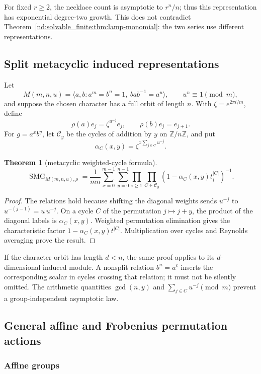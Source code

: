 \documentclass[10pt]{article}
\newcommand{\SMG}{\operatorname{SMG}}
\newcommand{\MGF}{\SMG}
\newtheorem{theorem}{Theorem}
\begin{document}
For fixed $r\geq2$, the necklace count is asymptotic to $r^n/n$; thus this
representation has exponential degree-two growth.  This does not contradict
Theorem~\ref{nd:solvable_finite:thm:lamp-monomial}: the two series use different representations.

\subsection{Split metacyclic induced representations}

Let
\[
 M(m,n,u)=\langle a,b:a^m=b^n=1,\ bab^{-1}=a^u\rangle,
 \qquad u^n\equiv1\pmod m,
\]
and suppose the chosen character has a full orbit of length $n$.  With
$\zeta=e^{2\pi i/m}$, define
\[
 \rho(a)e_j=\zeta^{u^{-j}}e_j,
 \qquad \rho(b)e_j=e_{j+1}.
\]
For $g=a^xb^y$, let $\mathcal C_y$ be the cycles of addition by $y$ on
$\mathbb Z/n\mathbb Z$, and put
\[
 \alpha_C(x,y)=\zeta^{x\sum_{j\in C}u^{-j}}.
\]

\begin{theorem}[metacyclic weighted-cycle formula]\label{nd:solvable_finite:thm:metacyclic}
\[
 \boxed{\MGF_{M(m,n,u),\rho}
 =\frac1{mn}\sum_{x=0}^{m-1}\sum_{y=0}^{n-1}
 \prod_{i\geq1}\prod_{C\in\mathcal C_y}
 (1-\alpha_C(x,y)t_i^{|C|})^{-1}.}
\]
\end{theorem}

\begin{proof}
The relations hold because shifting the diagonal weights sends
$u^{-j}$ to $u^{-(j-1)}=u\,u^{-j}$.  On a cycle $C$ of the permutation
$j\mapsto j+y$, the product of the diagonal labels is $\alpha_C(x,y)$.
Weighted permutation elimination gives the characteristic factor
$1-\alpha_C(x,y)t^{|C|}$.  Multiplication over cycles and Reynolds averaging
prove the result.
\end{proof}

If the character orbit has length $d<n$, the same proof applies to its
$d$-dimensional induced module.  A nonsplit relation $b^n=a^c$ inserts the
corresponding scalar in cycles crossing that relation; it must not be silently
omitted.  The arithmetic quantities $\gcd(n,y)$ and
$\sum_{j\in C}u^{-j}\pmod m$ prevent a group-independent asymptotic law.

\subsection{General affine and Frobenius permutation actions}

\subsubsection{Affine groups}
\end{document}
